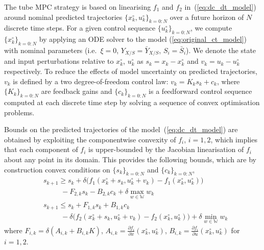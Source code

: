 \documentclass[final,5p,times,twocolumn,authoryear]{elsarticle}
\def\W{\mathbb{W}}
\begin{document}

The tube MPC strategy is based on linearising $f_1$ and $f_2$ in~(\ref{eq:dc_dt_model}) around nominal predicted trajectories $\{x_k^\circ, u_k^\circ\}_{k=0:N}$ over a future horizon of $N$ discrete time steps. For a given control sequence $\{ u_k^\circ\}_{k=0:N}$,  we compute $\{x_k^\circ\}_{k=0:N}$ by applying an ODE solver to the model 
(\ref{eq:original_ct_model}) with nominal parameters (i.e.~$\xi = 0$, $Y_{X/S} = \bar{Y}_{X/S}$, $S_i = \bar{S}_i$).
%
We denote the state and input perturbations relative to $x_k^\circ$, $u_k^\circ$ as $s_k=x_k-x_k^\circ$ and $v_k=u_k-u_k^\circ$ respectively.
%
To reduce the effects of model uncertainty on predicted trajectories, $v_k$ is defined by a two degree-of-freedom control law: $v_k=K_k s_k+c_k$, where $\{K_k\}_{k=0:N}$ are feedback gains and $\{c_k\}_{k=0:N}$ is a feedforward control sequence computed at each discrete time step by solving a sequence of convex optimisation problems.

Bounds on the predicted trajectories of the model~(\ref{eq:dc_dt_model}) are obtained by exploiting the componentwise convexity of $f_i$, $i=1,2$, which implies that each component of $f_i$ is upper-bounded by the Jacobian linearisation of $f_i$ about any point in its domain. This provides the following bounds, which are by construction convex conditions on $\{s_k\}_{k=0:N}$ and $\{c_k\}_{k=0:N}$, 
\begin{subequations}\label{eq:s_dynamics}
  \begin{align}
    & s_{k+1} \geq s_k 
    + \delta \bigl( f_1(x_k^\circ + s_k, u_k^\circ + v_k) - f_1(x_k^\circ, u_k^\circ) \bigr)
    \\
    & \qquad\ \ - F_{2,k} s_k - B_{2,k} c_k + \delta \max_{w\in\W} w_k
    \nonumber \\
    & s_{k+1} \leq s_k
    + F_{1,k} s_k + B_{1,k} c_k
    \\
     & \qquad\ \ - \delta \bigl( f_2(x_k^\circ + s_k, u_k^\circ + v_k)  - f_2(x_k^\circ, u_k^\circ) \bigr) + \delta \min_{w\in\W} w_k
       \nonumber
  \end{align}
  \end{subequations}
where $F_{i,k} = \delta( A_{i,k} + B_{i,k} K) $, $A_{i,k} = \tfrac{\partial f_i}{\partial x} (x_k^\circ , u_k^\circ)$, $B_{i,k}= \tfrac{\partial f_i}{\partial u} (x_k^\circ, u_k^\circ )$ for $i=1,2$. 
\end{document}

